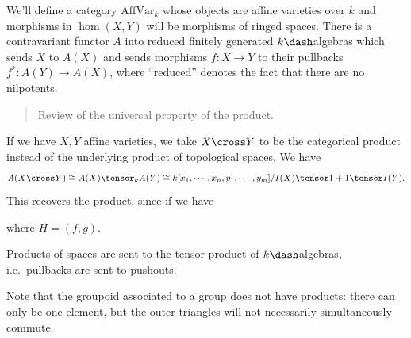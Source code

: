 We'll define a category \(\mathrm{AffVar}_k\) whose objects are affine
varieties over \(k\) and morphisms in \(\hom(X, Y)\) will be morphisms
of ringed spaces. There is a contravariant functor \(A\) into reduced
finitely generated \(k\dash\)algebras which sends \(X\) to \(A(X)\) and
sends morphisms \(f:X\to Y\) to their pullbacks \(f^*:A(Y) \to A(X)\),
where ``reduced'' denotes the fact that there are no nilpotents.

\begin{quote}
Review of the universal property of the product.
\end{quote}

\begin{remark}

If we have \(X,Y\) affine varieties, we take \(X\cross Y\) to be the
categorical product instead of the underlying product of topological
spaces. We have
\begin{align*}
A(X\cross Y) \cong A(X) \tensor_k A(Y) \cong k[x_1, \cdots, x_n, y_1, \cdots, y_m] / I(X) \tensor 1 + 1 \tensor I(Y).\end{align*}
This recovers the product, since if we have

\begin{center}
\end{center}

where \(H = (f, g)\).

\end{remark}

\begin{remark}

Products of spaces are sent to the tensor product of \(k\dash\)algebras,
i.e.~pullbacks are sent to pushouts.

\end{remark}

\begin{remark}

Note that the groupoid associated to a group does not have products:
there can only be one element, but the outer triangles will not
necessarily simultaneously commute.

\end{remark}

